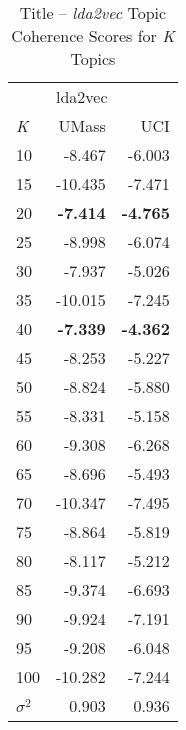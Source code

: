 \documentclass[letterpaper,12pt]{article}
\begin{document}
\begin{table}
	\caption{\label{tab:lda2vec_title_tc} Title -- \emph{lda2vec} Topic Coherence Scores for \emph{K} Topics}
	\begin{center}
		\begin{tabular}{lrr}
			\toprule
			{} & \multicolumn{2}{l}{lda2vec} \\
			\emph{K} &   UMass &    UCI \\
			\midrule
			10  &  -8.467 & -6.003 \\
			15  & -10.435 & -7.471 \\
			20  &  \textbf{-7.414} & \textbf{-4.765} \\
			25  &  -8.998 & -6.074 \\
			30  &  -7.937 & -5.026 \\
			35  & -10.015 & -7.245 \\
			40  &  \textbf{-7.339} & \textbf{-4.362} \\
			45  &  -8.253 & -5.227 \\
			50  &  -8.824 & -5.880 \\
			55  &  -8.331 & -5.158 \\
			60  &  -9.308 & -6.268 \\
			65  &  -8.696 & -5.493 \\
			70  & -10.347 & -7.495 \\
			75  &  -8.864 & -5.819 \\
			80  &  -8.117 & -5.212 \\
			85  &  -9.374 & -6.693 \\
			90  &  -9.924 & -7.191 \\
			95  &  -9.208 & -6.048 \\
			100 & -10.282 & -7.244 \\
			\midrule
			$\sigma^2$ & 0.903 & 0.936 \\
			\bottomrule
			\end{tabular}
	\end{center}
\end{table}



\end{document}
